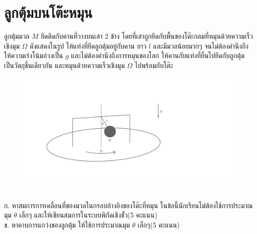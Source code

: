 \documentclass[a4paper,12pt]{article}
\begin{document}
\section{ลูกตุ้มบนโต๊ะหมุน}
ลูกตุ้มมวล $M$ ยึดติดกับคานที่วางบนเสา 2 ข้าง โดยที่เสาถูกยึดกับพื้นของโต๊ะกลมที่หมุนด้วยความเร็วเชิงมุม $\Omega$ ดังแสดงในรูป ให้แท่งที่ยึดลูกตุ้มอยู่กับคาน ยาว $l$ และมีมวลน้อยมากๆ จนไม่ต้องคำนึงถึง ให้ความเร่งโน้มถ่วงเป็น $g$ และไม่ต้องคำนึงถึงการหมุนของโลก ให้คานกับแท่งที่ยื่นไปยึดกับลูกตุ้มเป็นวัตถุชิ้นเดียวกัน และหมุนด้วยความเร็วเชิงมุม $\Omega$ ไปพร้อมกับโต๊ะ
\pagebreak
	\begin{figure}[h]
	\centering
	\includegraphics[scale=0.4]{2}
	\label{fig:2}
	\end{figure}
\\ก. หาสมการการเคลื่อนที่ของมวลในกรอบอ้างอิงของโต๊ะที่หมุน ในข้อนี้นักเรียนไม่ต้องใช้การประมาณมุม $\theta$ เล็กๆ และให้เขียนสมการในระบบพิกัดเชิงขั้ว\hfill(5 คะแนน)\\
ข. หาคาบการแกว่งของลูกตุ้ม ให้ใช้การประมาณมุม $\theta$ เล็กๆ\hfill(5 คะแนน)
\end{document}

